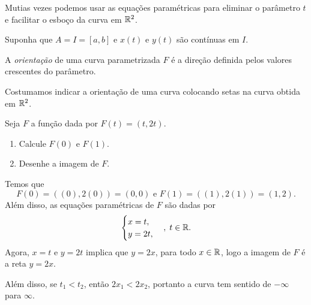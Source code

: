 \begin{remark}
    Mutias vezes podemos usar as equações paramétricas para eliminar o parâmetro \(t\) e facilitar o esboço da curva em \(\mathbb{R}^2\).
\end{remark}

\begin{example}
    Suponha que \(A = I = [a,b]\) e \(x(t)\) e \(y(t)\) são contínuas em \(I\).

\end{example}

\begin{definition}
    A \textit{orientação}\label{Curva !Orientação} de uma curva parametrizada \(F\) é a direção definida pelos valores crescentes do parâmetro.
\end{definition}


\begin{remark}
    Costumamos indicar a orientação de uma curva colocando setas na curva obtida em \(\mathbb{R}^2\).
\end{remark}

\begin{example}
    Seja \(F\) a função dada por \(F(t) = (t,2t)\).
        \begin{enumerate}
            \item Calcule \(F(0)\) e \(F(1)\).
            \item Desenhe a imagem de \(F\).
        \end{enumerate}

    Temos que \[F(0) = ((0),2(0)) = (0,0) \text{ e } F(1) = ((1),2(1)) = (1,2).\] Além disso, as equações paramétricas de \(F\) são dadas por \[\begin{cases}
        x = t, \\
        y = 2t,
    \end{cases},\; t\in\mathbb{R}.\] Agora, \(x = t\) e \(y = 2t\) implica que \(y = 2x\), para todo \(x\in\mathbb{R}\), logo a imagem de \(F\) é a reta \(y = 2x\). %

    Além disso, se \(t_1 < t_2\), então \(2x_1 < 2x_2\), portanto a curva tem sentido de \(-\infty\) para \(\infty\).
\end{example}


